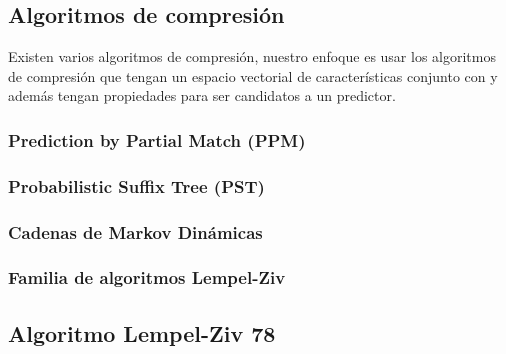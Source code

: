 \uncm
\subsection{Algoritmos de compresión}

Existen varios algoritmos de compresión, nuestro enfoque es usar los algoritmos de compresión que tengan un espacio vectorial de características conjunto con \machinelearning y además tengan propiedades para ser candidatos a un predictor. 


\subsubsection{Prediction by Partial Match (PPM)}

 
\subsubsection{Probabilistic Suffix Tree (PST)}


\subsubsection{Cadenas de Markov Dinámicas}


\subsubsection{Familia de algoritmos Lempel-Ziv}\label{ch2:sec-lzfamily}

\uncm
\subsection{Algoritmo Lempel-Ziv 78}















